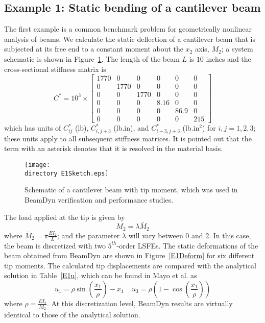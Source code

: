\subsection{Example 1: Static bending of a cantilever beam}

The first example is a common benchmark problem for geometrically nonlinear
analysis of beams\cite{Simo1985,Xiao-Zhong:2012}. We calculate the static
deflection of a cantilever beam that is subjected at its free end to
a constant moment about the $x_2$ axis, $M_2$; a system schematic is shown in Figure~\ref{E1Sketch}.  The length of the beam $L$ is $10$ inches and the cross-sectional stiffness 
matrix is 
\begin{equation}
    \label{StifE1}
    C^* = 10^3 \times \begin{bmatrix}
	1770 & 0    & 0    & 0    & 0    & 0   \\
	 0    & 1770 & 0    & 0    & 0    & 0   \\
	 0   &   0   & 1770 & 0    & 0    & 0   \\
	 0   &   0   &  0    & 8.16 & 0    & 0   \\
	 0   &   0   &  0    &  0    & 86.9 & 0   \\
	 0   &   0   &  0    &  0    &   0   & 215
\end{bmatrix}
\end{equation}
which has units of $C_{ij}^*$ (lb), $C_{i,j+3}^*$ (lb.in), and
$C_{i+3,j+3}^*$ (lb.in$^2$) for $i,j = 1,2,3$; these units apply to all
subsequent stiffness matrices. It is pointed out that the term with an
asterisk denotes that it is resolved in the material basis.

\begin{figure}
    \centering \texttt{[image: \\directory
E1Sketch.eps]} \caption{Schematic of a cantilever beam with tip moment,
which was used in BeamDyn verification and performance studies.}
    \label{E1Sketch}
\end{figure} 

The load applied at the tip is given by 
\begin{equation}
    \label{E1Load}
    M_2 = \lambda \bar{M}_2
\end{equation}
where $\bar{M}_2 = \pi \frac{EI_2}{L}$; and the parameter $\lambda$ will vary between $0$ and $2$. In 
this case, the beam is discretized with two $5^{th}$-order LSFEs. The
static deformations of the beam obtained from BeamDyn are shown in
Figure~\ref{E1Deform} for six different tip moments.
The calculated tip displacements are compared with the analytical solution
in Table~\ref{E1u},
which can be found in Mayo et al.\cite{Mayo-etal:2004} as
\begin{equation}
    \label{E1Analytical}
    u_1 = \rho \sin \left( \frac{x_1}{\rho} \right) - x_1~~~~~u_3 = \rho
\left(1-\cos\left(\frac{x_1}{\rho}\right) \right)
\end{equation}
where $\rho = \frac{EI_2}{M_2}$. At this discretization level, BeamDyn results are virtually
identical to those of the analytical solution.

